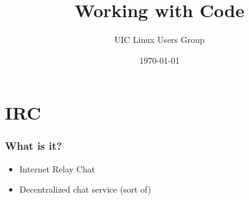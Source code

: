 \documentclass[hyperref={pdfpagelabels=false}]{beamer}
\title{Working with Code}
\author{UIC Linux Users Group}
\date{\today}
\begin{document}
\frame{\titlepage}
\section[outline]{}
\frame{\tableofcontents}
\section{IRC}
		\frame
		{
			\frametitle{What is it?}
			\begin{itemize}
				\item{Internet Relay Chat}
				\item{Decentralized chat service (sort of)}
			\end{itemize}
		}
\end{document}
